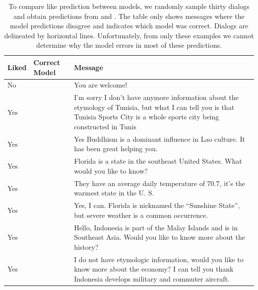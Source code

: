 \begin{table}[ht]
    \small
    \centering
    \begin{tabular}{l l p{12cm}}
        \toprule
        Liked & Correct Model & Message                                                                                                                                                                          \\
        \midrule
        No    & \bert{}       & You are welcome!                                                                                                                                                                 \\
        \midrule
        Yes   & \bert{}       & I'm sorry I don't have anymore information about the etymology of Tunisia, but what I can tell you is that Tunisia Sports City is a whole sports city being constructed in Tunis \\
        \midrule
        Yes   & \bert{}       & Yes Buddhism is a dominant influence in Lao culture. It has been great helping you.                                                                                              \\
        \midrule
        Yes   & \charm{}      & Florida is a state in the southeast United States. What would you like to know?                                                                                                  \\
        Yes   & \bert{}       & They have an average daily temperature of 70.7, it's the warmest state in the U. S.                                                                                              \\
        Yes   & \charm{}      & Yes, I can. Florida is nicknamed the ``Sunshine State'', but severe weather is a common occurrence.                                                                              \\
        \midrule
        Yes   & \bert{}       & Hello, Indonesia is part of the Malay Islands and is in Southeast Asia. Would you like to know more about the history?                                                           \\
        Yes   & \bert{}       & I do not have etymologic information, would you like to know more about the economy? I can tell you thank Indonesia develops military and commuter aircraft.                     \\
        \bottomrule
    \end{tabular}
    \caption{
        To compare like prediction between models, we randomly sample thirty dialogs and obtain predictions from \charm{} and \bert{}.
        The table only shows messages where the model predictions disagree and indicates which model was correct.
        Dialogs are delineated by horizontal lines.
        Unfortunately, from only these examples we cannot determine why the \charm{} model errors in most of these predictions.
    }
    \label{tab:like-compare}
\end{table}

